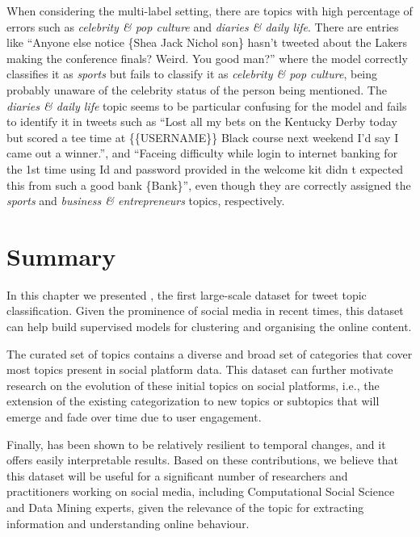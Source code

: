 When considering the multi-label setting, there are topics with high percentage of errors such as \textit{celebrity \& pop culture} and \textit{diaries \& daily life}. There are entries like ``Anyone else notice \{\@O Shea Jack Nichol son\@\} hasn’t tweeted about the Lakers making the conference finals? Weird. You good man?'' where the model correctly classifies it as \textit{sports} but fails to classify it as \textit{celebrity \& pop culture}, being probably unaware of the celebrity status of the person being mentioned. The \textit{diaries \& daily life} topic seems to be particular confusing for the model and fails to identify it in tweets such as ``Lost all my bets on the Kentucky Derby today but scored a tee time at \{\{USERNAME\}\} Black course next weekend I’d say I came out a winner.'', and ``Faceing difficulty while login to internet banking for the 1st time using Id and password provided in the welcome kit didn t expected this from such a good bank \{\@Canara Bank\@\}'',
even though they are correctly assigned the \textit{sports} and \textit{business \& entrepreneurs} topics, respectively. 

\section{Summary}
In this chapter we presented \TweetTopic, the first large-scale dataset for tweet topic classification. Given the prominence of social media in recent times, this dataset can help build supervised models for clustering and organising the online content. 

The curated set of topics contains a diverse and broad set of categories that cover most topics present in social platform data. This dataset can further motivate research on the evolution of these initial topics on social platforms, i.e., the extension of the existing categorization to new topics or subtopics that will emerge and fade over time due to user engagement. 

Finally, \TweetTopic has been shown to be relatively resilient to temporal changes, and it offers easily interpretable results. Based on these contributions, we believe that this dataset will be useful for a significant number of researchers and practitioners working on social media, including Computational Social Science and Data Mining experts, given the relevance of the topic for extracting information and understanding online behaviour.




